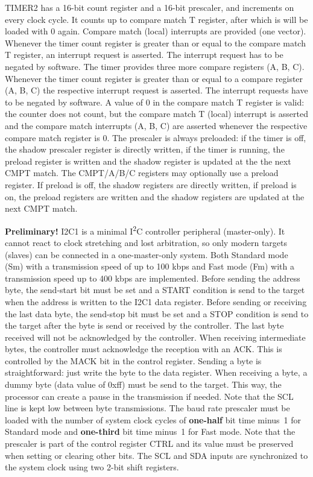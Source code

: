 \documentclass[12pt]{article}
\begin{document}
TIMER2 has a 16-bit count register and a 16-bit prescaler, and increments on every clock cycle. It counts up to compare match T register, after which is will be loaded with 0 again. Compare match (local) interrupts are provided (one vector). Whenever the timer count register is greater than or equal to the compare match T register, an interrupt request is asserted. The interrupt request has to be negated by software. The timer provides three more compare registers (A, B, C). Whenever the timer count register is greater than or equal to a compare register (A, B, C) the respective interrupt request is asserted. The interrupt requests have to be negated by software. A value of 0 in the compare match T register is valid: the counter does not count, but the compare match T (local) interrupt is asserted and the compare match interrupts (A, B, C) are asserted whenever the respective compare match register is 0. The prescaler is always preloaded: if the timer is off, the shadow prescaler register is directly written, if the timer is running, the preload register is written and the shadow register is updated at the the next CMPT match. The CMPT/A/B/C registers may optionally use a preload register. If preload is off, the shadow registers are directly written, if preload is on, the preload registers are written and the shadow registers are updated at the next CMPT match.

\textbf{Preliminary!}
I2C1 is a minimal I\textsuperscript{2}C controller peripheral (master-only). It cannot react to clock stretching and lost arbitration, so only modern targets (slaves) can be connected in a one-master-only system. Both Standard mode (Sm) with a transmission speed of up to 100 kbps and Fast mode (Fm) with a transmission speed up to 400 kbps are implemented. Before sending the address byte, the send-start bit must be set and a START condition is send to the target when the address is written to the I2C1 data register. Before sending or receiving the last data byte, the send-stop bit must be set and a STOP condition is send to the target after the byte is send or received by the controller. The last byte received will not be acknowledged by the controller. When receiving intermediate bytes, the controller must acknowledge the reception with an ACK. This is controlled by the MACK bit in the control register. Sending a byte is straightforward: just write the byte to the data register. When receiving a byte, a dummy byte (data value of 0xff) must be send to the target. This way, the processor can create a pause in the transmission if needed. Note that the SCL line is kept low between byte transmissions. The baud rate prescaler must be loaded with the number of system clock cycles of \textbf{one-half} bit time minus~1 for Standard mode and \textbf{one-third} bit time minus~1 for Fast mode. Note that the prescaler is part of the control register CTRL and its value must be preserved when setting or clearing other bits. The SCL and SDA inputs are synchronized to the system clock using two 2-bit shift registers.
\end{document}
